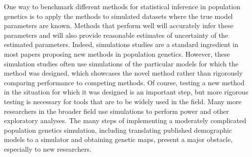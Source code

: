 \documentclass[12pt,halfline,a4paper]{ouparticle}
\begin{document}
One way to benchmark different methods for statistical inference in population
genetics is to apply the methods to simulated datasets where the true model
parameters are known. Methods that perform well will accurately infer these
parameters and will also provide reasonable estimates of uncertainty of the
estimated parameters. Indeed, simulations studies are a standard ingredient in
most papers proposing new methods in population genetics. However, these
simulation studies often use simulations of the particular models for which the method was designed,
which showcases the novel method rather than rigorously comparing performance to competing methods.
Of course, testing a new method in the situation for which it was designed is an important step,
but more rigorous testing is necessary for tools that are to be widely used in the field.
Many more researchers in the broader field
use simulations to perform power and other exploratory analyses.
The many steps of implementing a moderately complicated population genetics simulation,
including translating published demographic models to a simulator
and obtaining genetic maps,
present a major obstacle, especially to new researchers.

\end{document}
